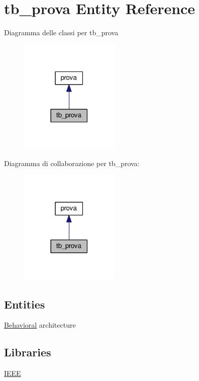 \hypertarget{classtb__prova}{\section{tb\+\_\+prova Entity Reference}
\label{classtb__prova}
}


Diagramma delle classi per tb\+\_\+prova\nopagebreak
\begin{figure}[H]
\begin{center}
\leavevmode
\includegraphics[width=134pt]{classtb__prova__inherit__graph}
\end{center}
\end{figure}


Diagramma di collaborazione per tb\+\_\+prova\+:\nopagebreak
\begin{figure}[H]
\begin{center}
\leavevmode
\includegraphics[width=134pt]{classtb__prova__coll__graph}
\end{center}
\end{figure}
\subsection*{Entities}
\begin{DoxyCompactItemize}
\item 
\hyperlink{classtb__prova_1_1_behavioral}{Behavioral} architecture
\end{DoxyCompactItemize}
\subsection*{Libraries}
 \begin{DoxyCompactItemize}
\item 
\hyperlink{classtb__prova_ae4f03c286607f3181e16b9aa12d0c6d4}{I\+E\+E\+E} 
\end{DoxyCompactItemize}
